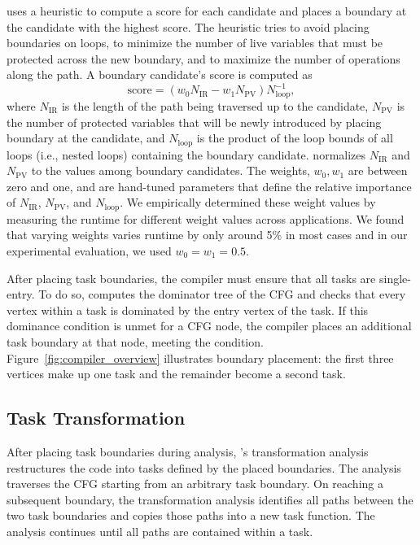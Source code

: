 \sys uses a heuristic to compute a score for each candidate and places a boundary at the candidate with the highest score. The heuristic tries to avoid placing boundaries on loops, to minimize the number of live variables that must be protected across the new boundary, and to maximize the number of operations along the path. A boundary candidate's score is computed as
%
\begin{equation}
\text{score} = {\left(w_{0} N_{\text{IR}} - w_{1} N_{\text{PV}}\right)}{N_{\text{loop}}^{-1}},\nonumber
\end{equation}
%
where $N_{\text{IR}}$ is the length of the path being traversed up to the candidate, $N_{\text{PV}}$ is the number of protected variables that will be newly introduced by placing boundary at the candidate, and $N_{\text{loop}}$ is the product of the loop bounds of all loops (i.e., nested loops) containing the boundary candidate. \sys normalizes $N_{\text{IR}}$ and $N_{\text{PV}}$ to the values among boundary candidates. The weights, $w_{0}, w_{1}$ are between zero and one, and are hand-tuned parameters that define the relative importance of $N_{\text{IR}}$,
$N_{\text{PV}}$, and $N_{\text{loop}}$. We empirically determined these weight values by measuring the runtime for different weight values across applications. We found that varying weights varies runtime by only around 5\% in most cases and in our experimental evaluation, we used $w_{0} = w_{1} = 0.5$.

After placing task boundaries, the compiler must ensure that all tasks are single-entry. To do so, \sys computes the dominator tree of the CFG and checks that every vertex within a task is dominated by the entry vertex of the task. If this dominance condition is unmet for a CFG node, the compiler places an additional task boundary at that node, meeting the condition. Figure~\ref{fig:compiler_overview} illustrates boundary placement: the first three vertices make up one task and the remainder become a second task.

\subsection{Task Transformation}
\label{sec:compiler_transform_pass}

After placing task boundaries during analysis, \sys's transformation analysis restructures the code into tasks defined by the placed boundaries. The analysis traverses the CFG starting from an arbitrary task boundary. On reaching a subsequent boundary, the transformation analysis identifies all paths between the two task boundaries and copies those paths into a new task function. The analysis continues until all paths are contained within a task. 

